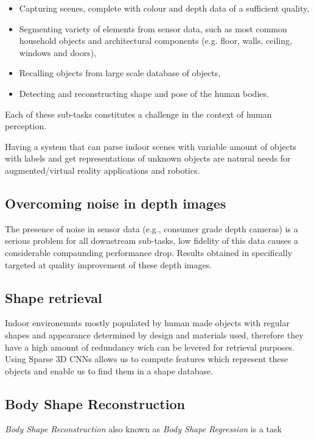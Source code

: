 \begin{itemize}
    \item Capturing scenes, complete with colour and depth data of a sufficient quality,
    \item Segmenting variety of elements from sensor data, such as most common household objects and architectural components (e.g. floor, walls, ceiling, windows and doors),
    \item Recalling objects from large scale database of objects,
    \item Detecting and reconstructing shape and pose of the human bodies.
\end{itemize}

Each of these sub-tasks constitutes a challenge in the context of human perception.

Having a system that can parse indoor scenes with variable amount of objects with labels and get representations of unknown objects are natural needs for augmented/virtual reality applications and robotics.

\subsection{Overcoming noise in depth images}
The presence of noise in sensor data (e.g., consumer grade depth cameras) is a serious problem for all downstream sub-tasks, low fidelity of this data causes a considerable compaunding performance drop. Results obtained in  specifically targeted at quality improvement of these depth images.

\subsection{Shape retrieval}

Indoor environemnts mostly populated by human made objects with regular shapes and appearance determined by design and materials used, therefore they have a high amount of redundancy wich can be levered for retrieval purposes. Using Sparse 3D CNNs allows us to compute features which represent these objects and enable us to find them in a shape database. 

\subsection{Body Shape Reconstruction}

\textit{Body Shape Reconstruction} also known as \textit{Body Shape Regression} is a task 
 
